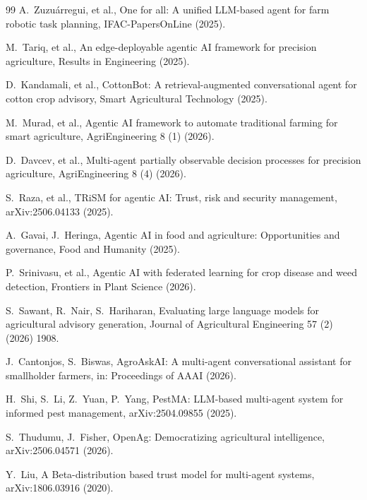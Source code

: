 \documentclass[preprint,12pt]{elsarticle}
\begin{document}
\begin{thebibliography}{99}
A.~Zuzu\'arregui, et al.,
One for all: A unified LLM-based agent for farm robotic task planning,
IFAC-PapersOnLine (2025).

M.~Tariq, et al.,
An edge-deployable agentic AI framework for precision agriculture,
Results in Engineering (2025).

D.~Kandamali, et al.,
CottonBot: A retrieval-augmented conversational agent for cotton crop advisory,
Smart Agricultural Technology (2025).

M.~Murad, et al.,
Agentic AI framework to automate traditional farming for smart agriculture,
AgriEngineering 8 (1) (2026).

D.~Davcev, et al.,
Multi-agent partially observable decision processes for precision agriculture,
AgriEngineering 8 (4) (2026).

S.~Raza, et al.,
TRiSM for agentic AI: Trust, risk and security management,
arXiv:2506.04133 (2025).

A.~Gavai, J.~Heringa,
Agentic AI in food and agriculture: Opportunities and governance,
Food and Humanity (2025).

P.~Srinivasu, et al.,
Agentic AI with federated learning for crop disease and weed detection,
Frontiers in Plant Science (2026).

S.~Sawant, R.~Nair, S.~Hariharan,
Evaluating large language models for agricultural advisory generation,
Journal of Agricultural Engineering 57 (2) (2026) 1908.

J.~Cantonjos, S.~Biswas,
AgroAskAI: A multi-agent conversational assistant for smallholder farmers,
in: Proceedings of AAAI (2026).

H.~Shi, S.~Li, Z.~Yuan, P.~Yang,
PestMA: LLM-based multi-agent system for informed pest management,
arXiv:2504.09855 (2025).

S.~Thudumu, J.~Fisher,
OpenAg: Democratizing agricultural intelligence,
arXiv:2506.04571 (2026).

Y.~Liu,
A Beta-distribution based trust model for multi-agent systems,
arXiv:1806.03916 (2020).


\end{thebibliography}
\end{document}
